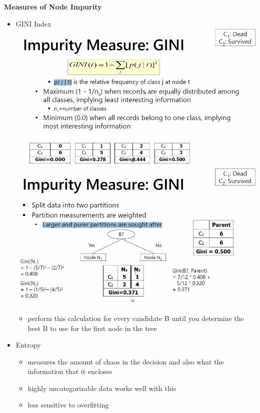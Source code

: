 \documentclass[12pt]{article}
\begin{document}
	\newpage \vfill
	\textbf{\centering Measures of Node Impurity}
	\begin{itemize}	
		\item GINI Index \newline
			{\centering \includegraphics[scale=.5]{gini.png}}
			{\centering \includegraphics[scale=.5]{impurity.png}}
			\newline
			\begin{itemize}
				\item perform this calculation for every candidate B until you determine the best B to use for the first node in the tree 
				\newline
			\end{itemize} 
		\item Entropy
		\begin{itemize}
				\item measures the amount of chaos in the decision and also what the information that it encloses 
				\item highly uncategorizable data works well with this 
				\item less sensitive to overfitting

\end{itemize}
\end{itemize}
\end{document}
